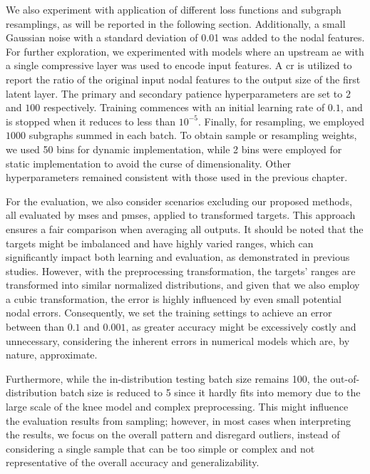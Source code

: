 \documentclass[12pt,a4paper]{report}
\begin{document}
We also experiment with application of different loss functions and subgraph resamplings, as will be reported in the following section. Additionally, a small Gaussian noise with a standard deviation of 0.01 was added to the nodal features. For further exploration, we experimented with models where an upstream \ac{ae} with a single compressive layer was used to encode input features. A \ac{cr} is utilized to report the ratio of the original input nodal features to the output size of the first latent layer. The primary and secondary patience hyperparameters are set to $2$ and $100$ respectively. Training commences with an initial learning rate of $0.1$, and is stopped when it reduces to less than $10^{-5}$. Finally, for resampling, we employed $1000$ subgraphs summed in each batch. To obtain sample or resampling weights, we used 50 bins for dynamic implementation, while 2 bins were employed for static implementation to avoid the curse of dimensionality. Other hyperparameters remained consistent with those used in the previous chapter.

For the evaluation, we also consider scenarios excluding our proposed methods, all evaluated by \acp{mse} and \acp{pmse}, applied to transformed targets. This approach ensures a fair comparison when averaging all outputs. It should be noted that the targets might be imbalanced and have highly varied ranges, which can significantly impact both learning and evaluation, as demonstrated in previous studies. However, with the preprocessing transformation, the targets' ranges are transformed into similar normalized distributions, and given that we also employ a cubic transformation, the error is highly influenced by even small potential nodal errors. Consequently, we set the training settings to achieve an error between than $0.1$ and $0.001$, as greater accuracy might be excessively costly and unnecessary, considering the inherent errors in numerical models which are, by nature, approximate.

Furthermore, while the in-distribution testing batch size remains 100, the out-of-distribution batch size is reduced to 5 since it hardly fits into memory due to the large scale of the knee model and complex preprocessing. This might influence the evaluation results from sampling; however, in most cases when interpreting the results, we focus on the overall pattern and disregard outliers, instead of considering a single sample that can be too simple or complex and not representative of the overall accuracy and generalizability. 
\end{document}
